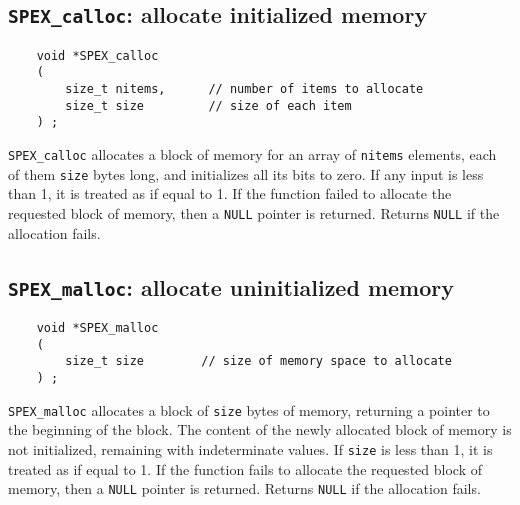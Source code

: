 \documentclass[12pt,oneside]{book}
\theoremstyle{definition}
\begin{document}
\subsection{\texttt{SPEX\_calloc}: allocate initialized memory} \label{ss:SPEX_calloc}
\begin{mdframed}[userdefinedwidth=\textwidth]
{\footnotesize
\begin{verbatim}
    void *SPEX_calloc 
    ( 
        size_t nitems,      // number of items to allocate 
        size_t size         // size of each item 
    ) ;
\end{verbatim}
} \end{mdframed}

\verb|SPEX_calloc| allocates a block of memory for an array of \verb|nitems|
elements, each of them \verb|size| bytes long, and initializes all its bits to
zero. If any input is less than 1, it is treated as if equal to 1. If the
function failed to allocate the requested block of memory, then a \verb|NULL|
pointer is returned.
Returns \verb|NULL| if the allocation fails.


\newpage
\subsection{\texttt{SPEX\_malloc}: allocate uninitialized memory} \label{ss:SPEX_malloc}
\begin{mdframed}[userdefinedwidth=\textwidth]
{\footnotesize
\begin{verbatim}
    void *SPEX_malloc
    (
        size_t size        // size of memory space to allocate
    ) ;
\end{verbatim}
} \end{mdframed}

\verb|SPEX_malloc| allocates a block of \verb|size| bytes of memory, returning
a pointer to the beginning of the block. The content of the newly allocated
block of memory is not initialized, remaining with indeterminate values.
If \verb|size| is less than 1, it is treated as if equal to 1. If the function
fails to allocate the requested block of memory, then a \verb|NULL| pointer is
returned.
Returns \verb|NULL| if the allocation fails.
\end{document}
